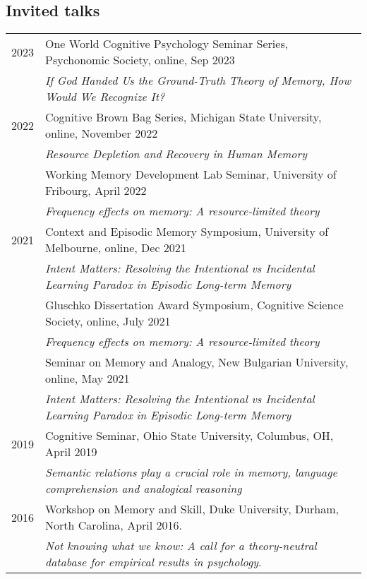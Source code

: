 \documentclass[letterpaper]{article}
\begin{document}
\subsection*{Invited talks}
\begin{longtable}{p{0.7cm}p{15cm}}
2023 & One World Cognitive Psychology Seminar Series, Psychonomic Society, online, Sep 2023\\
& {\it If God Handed Us the Ground-Truth Theory of Memory, How Would We Recognize It?}\\[6pt]
2022 & Cognitive Brown Bag Series, Michigan State University, online, November 2022\\ & {\it Resource Depletion and Recovery in Human Memory}\\[6pt] 
& Working Memory Development Lab Seminar, University of Fribourg, April 2022\\ & {\it Frequency effects on memory: A resource-limited theory}\\[6pt] 
2021 & Context and Episodic Memory Symposium, University of Melbourne, online, Dec 2021\\ & {\it Intent Matters: Resolving the Intentional vs Incidental Learning Paradox in Episodic Long-term Memory}\\[6pt]
& Gluschko Dissertation Award Symposium, Cognitive Science Society, online, July 2021\\ & {\it Frequency effects on memory: A resource-limited theory}\\[6pt] 
& Seminar on Memory and Analogy, New Bulgarian University, online, May 2021\\ & {\it Intent Matters: Resolving the Intentional vs Incidental Learning Paradox in Episodic Long-term Memory}\\[6pt]
2019 & Cognitive Seminar, Ohio State University, Columbus, OH, April 2019\\ & {\it Semantic relations play a crucial role in memory, language comprehension and analogical reasoning}\\[6pt]
2016 & Workshop on Memory and Skill, Duke University, Durham, North Carolina, April 2016.\\ & {\it Not knowing what we know: A call for a theory-neutral database for empirical results in psychology}.\\[6pt]
\end{longtable}
\end{document}
